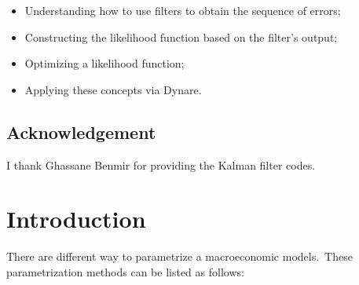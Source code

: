 \documentclass[a4paper,12pt]{article}%
\begin{document}
\FRONTPAGE%

\vspace{4ex}
\begin{myobjs}%


\begin{itemize}
\item Understanding how to use filters to obtain the sequence of errors;

\item Constructing the likelihood function based on the filter's output;

\item Optimizing a likelihood function;

\item Applying these concepts via Dynare.
\end{itemize}

%

\end{myobjs}%


\subsection*{Acknowledgement}

I thank Ghassane Benmir for providing the Kalman filter codes.

\newpage

\section{Introduction}

\noindent There are different way to parametrize a macroeconomic
models.\ These parametrization methods can be listed as follows:
\end{document}
